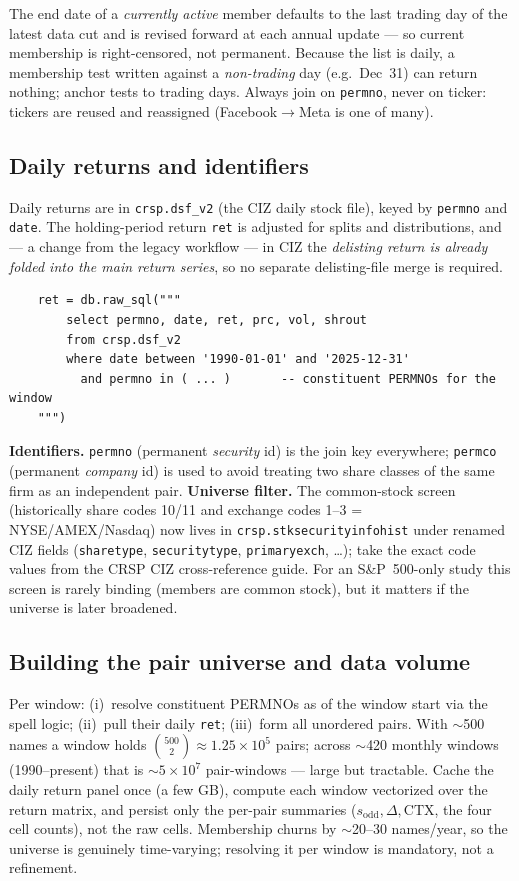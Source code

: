\documentclass[11pt]{article}
\newcommand{\sodd}{s_{\mathrm{odd}}}
\begin{document}
\begin{cautionbox}
The end date of a \emph{currently active} member defaults to the last trading day of the latest
data cut and is revised forward at each annual update --- so current membership is
right-censored, not permanent. Because the list is daily, a membership test written against a
\emph{non-trading} day (e.g.\ Dec~31) can return nothing; anchor tests to trading days. Always
join on \texttt{permno}, never on ticker: tickers are reused and reassigned (Facebook$\to$Meta
is one of many).
\end{cautionbox}

\subsection{Daily returns and identifiers}
Daily returns are in \texttt{crsp.dsf\_v2} (the CIZ daily stock file), keyed by \texttt{permno}
and \texttt{date}. The holding-period return \texttt{ret} is adjusted for splits and
distributions, and --- a change from the legacy workflow --- in CIZ the \emph{delisting return is
already folded into the main return series}, so no separate delisting-file merge is required.
\begin{verbatim}
    ret = db.raw_sql("""
        select permno, date, ret, prc, vol, shrout
        from crsp.dsf_v2
        where date between '1990-01-01' and '2025-12-31'
          and permno in ( ... )       -- constituent PERMNOs for the window
    """)
\end{verbatim}
\textbf{Identifiers.} \texttt{permno} (permanent \emph{security} id) is the join key
everywhere; \texttt{permco} (permanent \emph{company} id) is used to avoid treating two share
classes of the same firm as an independent pair. \textbf{Universe filter.} The common-stock
screen (historically share codes 10/11 and exchange codes 1--3 = NYSE/AMEX/Nasdaq) now lives in
\texttt{crsp.stksecurityinfohist} under renamed CIZ fields (\texttt{sharetype},
\texttt{securitytype}, \texttt{primaryexch}, \dots); take the exact code values from the CRSP
CIZ cross-reference guide. For an S\&P~500-only study this screen is rarely binding (members are
common stock), but it matters if the universe is later broadened.

\subsection{Building the pair universe and data volume}
Per window: (i)~resolve constituent PERMNOs as of the window start via the spell logic;
(ii)~pull their daily \texttt{ret}; (iii)~form all unordered pairs. With $\sim$500 names a
window holds $\binom{500}{2}\approx1.25\times10^5$ pairs; across $\sim$420 monthly windows
(1990--present) that is $\sim$$5\times10^7$ pair-windows --- large but tractable. Cache the daily
return panel once (a few GB), compute each window vectorized over the return matrix, and persist
only the per-pair summaries ($\sodd,\Delta,\mathrm{CTX}$, the four cell counts), not the raw
cells. Membership churns by $\sim$20--30 names/year, so the universe is genuinely time-varying;
resolving it per window is mandatory, not a refinement.
\end{document}
